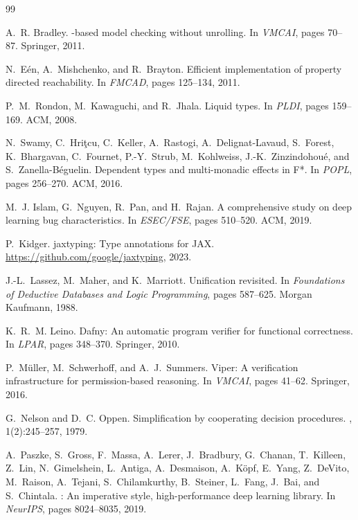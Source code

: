 \documentclass[10pt]{article}
\theoremstyle{plain}
\theoremstyle{definition}
\theoremstyle{remark}
\begin{document}
\begin{thebibliography}{99}

A.~R. Bradley.
-based model checking without unrolling.
\newblock In {\em VMCAI}, pages 70--87. Springer, 2011.

N.~E{\'e}n, A.~Mishchenko, and R.~Brayton.
\newblock Efficient implementation of property directed reachability.
\newblock In {\em FMCAD}, pages 125--134, 2011.

P.~M.~Rondon, M.~Kawaguchi, and R.~Jhala.
\newblock Liquid types.
\newblock In {\em PLDI}, pages 159--169. ACM, 2008.

N.~Swamy, C.~Hri\c{t}cu, C.~Keller, A.~Rastogi, A.~Delignat-Lavaud,
  S.~Forest, K.~Bhargavan, C.~Fournet, P.-Y.~Strub, M.~Kohlweiss,
  J.-K.~Zinzindohou\'{e}, and S.~Zanella-B\'{e}guelin.
\newblock Dependent types and multi-monadic effects in {F*}.
\newblock In {\em POPL}, pages 256--270. ACM, 2016.

M.~J. Islam, G.~Nguyen, R.~Pan, and H.~Rajan.
\newblock A comprehensive study on deep learning bug characteristics.
\newblock In {\em ESEC/FSE}, pages 510--520. ACM, 2019.

P.~Kidger.
\newblock jaxtyping: Type annotations for {JAX}.
\newblock \url{https://github.com/google/jaxtyping}, 2023.

J.-L.~Lassez, M.~Maher, and K.~Marriott.
\newblock Unification revisited.
\newblock In {\em Foundations of Deductive Databases and Logic Programming},
  pages 587--625. Morgan Kaufmann, 1988.

K.~R.~M. Leino.
\newblock Dafny: An automatic program verifier for functional correctness.
\newblock In {\em LPAR}, pages 348--370. Springer, 2010.

P.~M\"{u}ller, M.~Schwerhoff, and A.~J.~Summers.
\newblock Viper: A verification infrastructure for permission-based reasoning.
\newblock In {\em VMCAI}, pages 41--62. Springer, 2016.

G.~Nelson and D.~C. Oppen.
\newblock Simplification by cooperating decision procedures.
, 1(2):245--257, 1979.

A.~Paszke, S.~Gross, F.~Massa, A.~Lerer, J.~Bradbury,
  G.~Chanan, T.~Killeen, Z.~Lin, N.~Gimelshein,
  L.~Antiga, A.~Desmaison, A.~K{\"o}pf, E.~Yang, Z.~DeVito,
  M.~Raison, A.~Tejani, S.~Chilamkurthy, B.~Steiner,
  L.~Fang, J.~Bai, and S.~Chintala.
: An imperative style, high-performance deep learning
  library.
\newblock In {\em NeurIPS}, pages 8024--8035, 2019.


\end{thebibliography}
\end{document}
